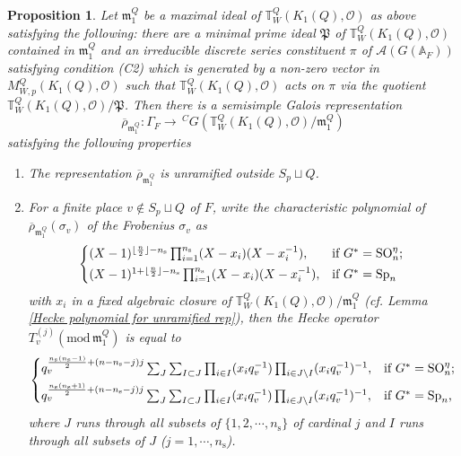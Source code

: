 \documentclass[12pt,oneside,reqno]{amsart}
\theoremstyle{plain}
\newtheorem{proposition}[theorem]{Proposition}
\begin{document}
	\begin{proposition}\label{residual Galois rep associated to auto rep}
		Let
		$\mathfrak{m}_1^Q$
		be a maximal ideal of
		$\mathbb{T}^{Q}_W(K_1(Q),\mathcal{O})$ as above satisfying the following: there are a minimal prime ideal $\mathfrak{P}$ of $\mathbb{T}^{Q}_W(K_1(Q),\mathcal{O})$ contained in $\mathfrak{m}_1^Q$ and an irreducible discrete series constituent $\pi$ of $\mathcal{A}(G(\mathbb{A}_F))$ satisfying condition (C2) which is generated by a non-zero vector in $M_{W,p}^Q(K_1(Q),\mathcal{O})$ such that $\mathbb{T}_W^{Q}(K_1(Q),\mathcal{O})$ acts on $\pi$ via the quotient $\mathbb{T}_W^{Q}(K_1(Q),\mathcal{O})/\mathfrak{P}$.
		Then there is a semisimple Galois representation
		\[
		\overline{\rho}_{\mathfrak{m}_1^Q}
		\colon
		\Gamma_F
		\rightarrow
		\,^CG
		\left(
		\mathbb{T}^{Q}_W(K_1(Q),\mathcal{O})/\mathfrak{m}_1^Q
		\right)
		\]
		satisfying the following properties
		\begin{enumerate}
			\item 
			The representation $\overline{\rho}_{\mathfrak{m}_1^Q}$ is unramified outside $S_p\sqcup Q$.
			
			
			\item 
			For a finite place 
			$v\notin S_p\sqcup Q$ of $F$, write
			the characteristic polynomial
			of
			$\overline{\rho}_{\mathfrak{m}_1^Q}(\sigma_v)$
			of the Frobenius $\sigma_v$
			as
			\[
			\begin{cases*}
				(X-1)^{\lfloor\frac{n}{2}\rfloor-n_\mathrm{s}}
				\prod_{i=1}^{n_\mathrm{s}}
				(X-x_i)
				(X-x_i^{-1}),
				&
				if $G^\ast=\mathrm{SO}_n^\eta$;
				\\
				(X-1)^{1+\lfloor\frac{n}{2}\rfloor-n_\mathrm{s}}
				\prod_{i=1}^{n_\mathrm{s}}
				(X-x_i)
				(X-x_i^{-1}),
				&
				if $G^\ast=\mathrm{Sp}_n$
			\end{cases*}
			\]
			with
			$x_i$ in a fixed algebraic closure of
			$\mathbb{T}^{Q}_W(K_1(Q),
			\mathcal{O})/\mathfrak{m}_1^Q$ (cf. Lemma \ref{Hecke polynomial for unramified rep}),
			then
			the Hecke operator
			$T_v^{(j)}(\mathrm{mod}\,\mathfrak{m}_1^Q)$
			is equal to
			\[
			\begin{cases*}
				q_v^{\frac{n_\mathrm{s}(n_\mathrm{s}-1)}{2}
					+
					(n-n_\mathrm{s}-j)j}
				\sum_{J}
				\sum_{I\subset J}
				\prod_{i\in I}
				(x_iq_v^{-1})
				\prod_{i\in J\backslash I}
				(x_iq_v^{-1})^{-1},
				&
				if $G^\ast=\mathrm{SO}_n^\eta$;
				\\
				q_v^{\frac{n_\mathrm{s}(n_\mathrm{s}+1)}{2}
					+
					(n-n_\mathrm{s}-j)j}
				\sum_{J}
				\sum_{I\subset J}
				\prod_{i\in I}
				(x_iq_v^{-1})
				\prod_{i\in J\backslash I}
				(x_iq_v^{-1})^{-1},
				&
				if $G^\ast=\mathrm{Sp}_n$,
			\end{cases*}
			\]
			where
			$J$ runs through all subsets of
			$\{1,2,\cdots,n_\mathrm{s}\}$
			of cardinal $j$ and
			$I$ runs through all subsets of $J$
			($j=1,\cdots,n_\mathrm{s}$).
			

\end{enumerate}
\end{proposition}
\end{document}
